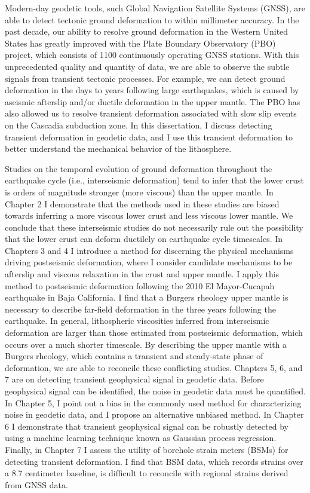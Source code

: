 Modern-day geodetic tools, such Global Navigation Satellite Systems
(GNSS), are able to detect tectonic ground deformation to within
millimeter accuracy. In the past decade, our ability to resolve ground
deformation in the Western United States has greatly improved with the
Plate Boundary Observatory (PBO) project, which consists of 1100
continuously operating GNSS stations. With this unprecedented quality
and quantity of data, we are able to observe the subtle signals from
transient tectonic processes. For example, we can detect ground
deformation in the days to years following large earthquakes, which is
caused by aseismic afterslip and/or ductile deformation in the upper
mantle. The PBO has also allowed us to resolve transient deformation
associated with slow slip events on the Cascadia subduction zone. In
this dissertation, I discuss detecting transient deformation in
geodetic data, and I use this transient deformation to better
understand the mechanical behavior of the lithosphere. 

Studies on the temporal evolution of ground deformation throughout the
earthquake cycle (i.e., interseismic deformation) tend to infer that
the lower crust is orders of magnitude stronger (more viscous) than
the upper mantle. In Chapter 2 I demonstrate that the methods used in
these studies are biased towards inferring a more viscous lower crust
and less viscous lower mantle. We conclude that these interseismic
studies do not necessarily rule out the possibility that the lower
crust can deform ductilely on earthquake cycle timescales. In Chapters
3 and 4 I introduce a method for discerning the physical mechanisms
driving postseismic deformation, where I consider candidate mechanisms
to be afterslip and viscous relaxation in the crust and upper mantle.
I apply this method to postseismic deformation following the 2010 El
Mayor-Cucapah earthquake in Baja California. I find that a Burgers
rheology upper mantle is necessary to describe far-field deformation
in the three years following the earthquake. In general, lithospheric
viscosities inferred from interseismic deformation are larger than
those estimated from postseismic deformation, which occurs over a much
shorter timescale. By describing the upper mantle with a Burgers
rheology, which contains a transient and steady-state phase of
deformation, we are able to reconcile these conflicting studies.
Chapters 5, 6, and 7 are on detecting transient geophysical signal in
geodetic data. Before geophysical signal can be identified, the noise
in geodetic data must be quantified. In Chapter 5, I point out a bias
in the commonly used method for characterizing noise in geodetic data,
and I propose an alternative unbiased method. In Chapter 6 I
demonstrate that transient geophysical signal can be robustly detected
by using a machine learning technique known as Gaussian process
regression. Finally, in Chapter 7 I assess the utility of borehole
strain meters (BSMs) for detecting transient deformation. I find that
BSM data, which records strains over a 8.7 centimeter baseline, is
difficult to reconcile with regional strains derived from GNSS data. 
